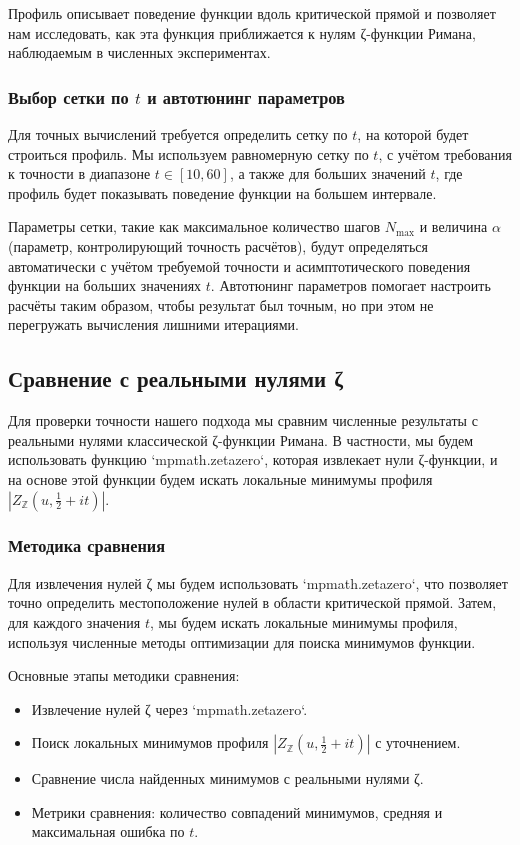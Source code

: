 \documentclass{article}
\numberwithin{equation}{section}
\theoremstyle{plain}
\theoremstyle{definition}
\theoremstyle{remark}
\def\alpha{α}\def\beta{β}\def\gamma{γ}\def\Gamma{Γ}%
\begin{document}
Профиль описывает поведение функции вдоль критической прямой и позволяет нам исследовать, как эта функция приближается к нулям ζ-функции Римана, наблюдаемым в численных экспериментах.
\subsubsection{Выбор сетки по \( t \) и автотюнинг параметров}
\label{subsubsec:grid-and-tuning}

\noindent
Для точных вычислений требуется определить сетку по \( t \), на которой будет строиться профиль. Мы используем равномерную сетку по \( t \), с учётом требования к точности в диапазоне \( t \in [10, 60] \), а также для больших значений \( t \), где профиль будет показывать поведение функции на большем интервале. 

Параметры сетки, такие как максимальное количество шагов \( N_{\max} \) и величина \( \alpha \) (параметр, контролирующий точность расчётов), будут определяться автоматически с учётом требуемой точности и асимптотического поведения функции на больших значениях \( t \). Автотюнинг параметров помогает настроить расчёты таким образом, чтобы результат был точным, но при этом не перегружать вычисления лишними итерациями.

\subsection{Сравнение с реальными нулями ζ}
\label{subsec:comparison-with-zeros}

\noindent
Для проверки точности нашего подхода мы сравним численные результаты с реальными нулями классической ζ-функции Римана. В частности, мы будем использовать функцию `mpmath.zetazero`, которая извлекает нули ζ-функции, и на основе этой функции будем искать локальные минимумы профиля \( |Z_{\mathbb Z}(u, \tfrac{1}{2} + it)| \).

\subsubsection{Методика сравнения}
\label{subsubsec:comparison-methodology}

\noindent
Для извлечения нулей ζ мы будем использовать `mpmath.zetazero`, что позволяет точно определить местоположение нулей в области критической прямой. Затем, для каждого значения \( t \), мы будем искать локальные минимумы профиля, используя численные методы оптимизации для поиска минимумов функции.

Основные этапы методики сравнения:
\begin{itemize}
  \item Извлечение нулей ζ через `mpmath.zetazero`.
  \item Поиск локальных минимумов профиля \( |Z_{\mathbb Z}(u, \tfrac{1}{2} + it)| \) с уточнением.
  \item Сравнение числа найденных минимумов с реальными нулями ζ.
  \item Метрики сравнения: количество совпадений минимумов, средняя и максимальная ошибка по \( t \).
\end{itemize}
\end{document}
